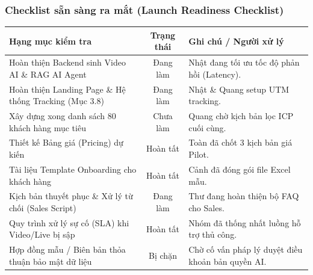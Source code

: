 \subsubsection{Checklist sẵn sàng ra mắt (Launch Readiness Checklist)}

\begin{table}[H]
    \centering
    \footnotesize
    \renewcommand{\arraystretch}{1.3}
    \begin{tabularx}{\linewidth}{|l|c|X|}
        \hline
        \rowcolor{softBlue}
        \textbf{Hạng mục kiểm tra} & \textbf{Trạng thái} & \textbf{Ghi chú / Người xử lý} \\ \hline
        Hoàn thiện Backend sinh Video AI \& RAG AI Agent & Đang làm & Nhật đang tối ưu tốc độ phản hồi (Latency). \\ \hline
        Hoàn thiện Landing Page \& Hệ thống Tracking (Mục 3.8) & Đang làm & Nhật \& Quang setup UTM tracking. \\ \hline
        Xây dựng xong danh sách 80 khách hàng mục tiêu & Chưa làm & Quang chờ kịch bản lọc ICP cuối cùng. \\ \hline
        Thiết kế Bảng giá (Pricing) dự kiến & Hoàn tất & Toàn đã chốt 3 kịch bản giá Pilot. \\ \hline
        Tài liệu Template Onboarding cho khách hàng & Hoàn tất & Cảnh đã đóng gói file Excel mẫu. \\ \hline
        Kịch bản thuyết phục \& Xử lý từ chối (Sales Script) & Đang làm & Thư đang hoàn thiện bộ FAQ cho Sales. \\ \hline
        Quy trình xử lý sự cố (SLA) khi Video/Live bị sập & Hoàn tất & Nhóm đã thống nhất luồng hỗ trợ thủ công. \\ \hline
        Hợp đồng mẫu / Biên bản thỏa thuận bảo mật dữ liệu & Bị chặn & Chờ cố vấn pháp lý duyệt điều khoản bản quyền AI. \\ \hline
    \end{tabularx}
\end{table}